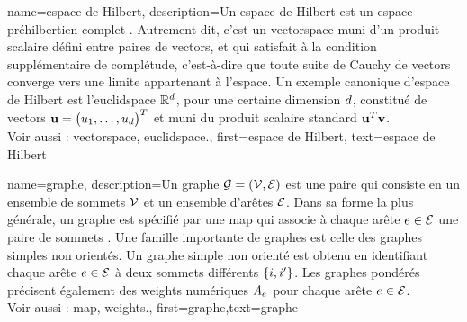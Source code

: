 {name={espace de Hilbert},
	description={Un espace de Hilbert est un espace préhilbertien complet \cite{introhilbertbook}. 
		Autrement dit, c’est un \gls{vectorspace} muni d’un produit scalaire défini entre paires de \glspl{vector}, 
		et qui satisfait à la condition supplémentaire de complétude, c’est-à-dire que toute suite de Cauchy de \glspl{vector} 
		converge vers une limite appartenant à l’espace. Un exemple canonique d’espace de Hilbert est l’\gls{euclidspace} 
		$\mathbb{R}^{d}$, pour une certaine dimension $d$, constitué de \glspl{vector} 
		${\bf u} = \big(u_1, \ldots, u_{d}\big)^T$ et muni du produit scalaire standard ${\bf u}^T {\bf v}$.
		\\
		Voir aussi : \gls{vectorspace}, \gls{euclidspace}.},
	first={espace de Hilbert},
	text={espace de Hilbert}
}

{name={graphe},
	description={Un graphe $\mathcal{G} = \left( \mathcal{V},\mathcal{E} \right)$ est une paire qui consiste en un ensemble de sommets $\mathcal{V}$ et un ensemble d’arêtes $\mathcal{E}$. Dans sa forme la plus générale, un graphe est spécifié par une \gls{map} qui associe à chaque arête $e \in \mathcal{E}$ une paire de sommets \cite{RockNetworks}. Une famille importante de graphes est celle des graphes simples non orientés. Un graphe simple non orienté est obtenu en identifiant chaque arête $e \in \mathcal{E}$ à deux sommets différents $\{i,i'\}$. Les graphes pondérés précisent également des \gls{weights} numériques $A_{e}$ pour chaque arête $e \in \mathcal{E}$.
		\\
		Voir aussi : \gls{map}, \gls{weights}.},
	first={graphe},text={graphe}
}



